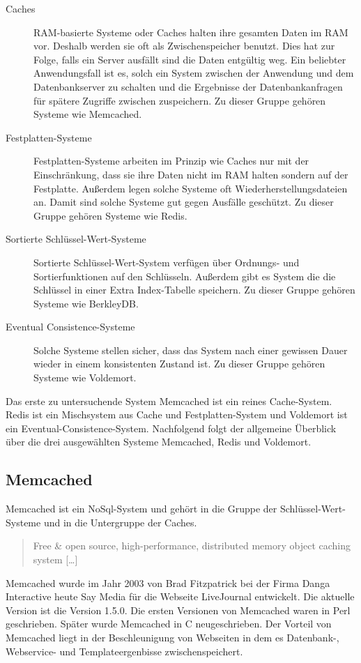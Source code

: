 \begin{description}
    \item[Caches] \gls{RAM}-basierte Systeme oder Caches halten ihre gesamten
        Daten im \gls{RAM} vor. Deshalb werden sie oft als Zwischenspeicher
        benutzt. Dies hat zur Folge, falls ein Server ausfällt sind die Daten
        entgültig weg. Ein beliebter Anwendungsfall ist es, solch ein System
        zwischen der Anwendung und dem Datenbankserver zu schalten und die
        Ergebnisse der Datenbankanfragen für spätere Zugriffe zwischen
        zuspeichern. Zu dieser Gruppe gehören Systeme wie Memcached.
    \item[Festplatten-Systeme] Festplatten-Systeme arbeiten im Prinzip wie Caches
        nur mit der Einschränkung, dass sie ihre Daten nicht im \gls{RAM} halten
        sondern auf der Festplatte. Außerdem legen solche Systeme oft
        Wiederherstellungsdateien an. Damit sind solche Systeme gut gegen
        Ausfälle geschützt. Zu dieser Gruppe gehören Systeme wie Redis.
    \item[Sortierte Schlüssel-Wert-Systeme] Sortierte Schlüssel-Wert-System
        verfügen über Ordnungs- und Sortierfunktionen auf den Schlüsseln.
        Außerdem gibt es System die die Schlüssel in einer Extra Index-Tabelle
        speichern. Zu dieser Gruppe gehören Systeme wie BerkleyDB.
    \item[Eventual Consistence-Systeme] Solche Systeme stellen sicher, dass das
        System nach einer gewissen Dauer wieder in einem konsistenten Zustand
        ist. Zu dieser Gruppe gehören Systeme wie Voldemort.
\end{description}

Das erste zu untersuchende System Memcached ist ein reines Cache-System.
Redis ist ein Mischsystem aus Cache und Festplatten-System und Voldemort ist
ein Eventual-Consistence-System. Nachfolgend folgt der allgemeine Überblick über
die drei ausgewählten Systeme Memcached, Redis und Voldemort.

\subsection{Memcached}
Memcached ist ein NoSql-System und gehört in die Gruppe der
Schlüssel-Wert-Systeme und in die Untergruppe der Caches.

\foreignblockquote{english}[\cite{Memcached2017}]{Free \& open source,
high-performance, distributed memory object caching system [\ldots]}

Memcached wurde im Jahr 2003 von Brad Fitzpatrick bei der Firma Danga
Interactive heute Say Media für die Webseite LiveJournal entwickelt. Die
aktuelle Version ist die Version 1.5.0. Die ersten Versionen von Memcached
waren in Perl geschrieben. Später wurde Memcached in C neugeschrieben. Der
Vorteil von Memcached liegt in der Beschleunigung von Webseiten in dem es
Datenbank-, Webservice- und Templateergenbisse zwischenspeichert.

